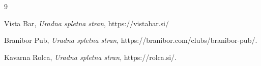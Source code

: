 \documentclass[a4paper,11pt]{article}
\begin{document}
\begin{thebibliography}{9}

Vista Bar, \textit{Uradna spletna stran},
https://vistabar.si/

Branibor Pub, \textit{Uradna spletna stran},
https://branibor.com/clubs/branibor-pub/.

Kavarna Rolca, \textit{Uradna spletna stran},
https://rolca.si/.

\end{thebibliography}
\end{document}
